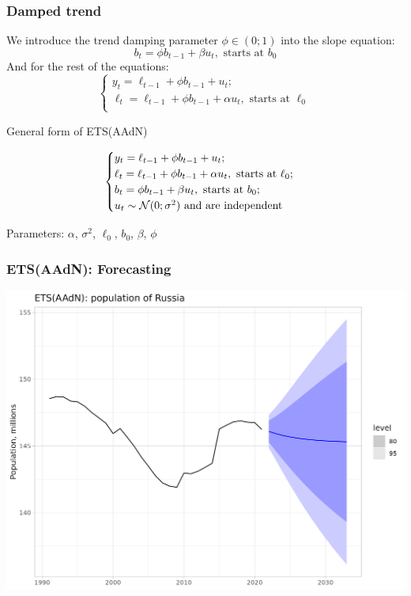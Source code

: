 \begin{frame}
	\frametitle{Damped trend}
	
	We introduce the trend damping parameter $\phi \in (0; 1)$ into the slope equation:
	\[
	b_t = \phi b_{t-1} + \beta u_t, \text{ starts at } b_0
	\]
	\pause
	And for the rest of the equations:
	\[
	\begin{cases}
		y_t = \ell_{t-1} + \phi b_{t-1} + u_t; \\
		\ell_t = \ell_{t-1} + \phi b_{t-1} + \alpha u_t, \text{ starts at } \ell_0\\
	\end{cases}
	\]
	
\end{frame}


\begin{frame}{General form of ETS(AAdN)}
	
	\[
	\begin{cases}
		y_t = \ell_{t-1} + \phi b_{t-1} + u_t; \\
		\ell_t = \ell_{t-1} + \phi b_{t-1} + \alpha u_t, \text{ starts at } \ell_0; \\
		b_t = \phi b_{t-1} + \beta u_t, \text{ starts at } b_0; \\
		u_t \sim \mathcal{N}(0;\sigma^2) \text{ and are independent} \\
	\end{cases}
	\]
	
	
	
	Parameters: $\alpha$, $\sigma^2$, $\ell_0$, $b_0$, $\beta$, $\phi$
\end{frame}

\begin{frame}
	\frametitle{ETS(AAdN): Forecasting}
	
	\includegraphics[width=\textwidth]{pictures/om_ts_03-019.png}
	
	
\end{frame}





